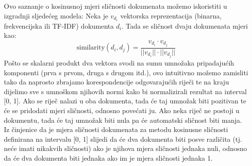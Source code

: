 \documentclass[times, utf8, zavrsni]{fer}
\begin{document}
Ovo saznanje o kosinusnoj mjeri sličnosti dokumenata možemo iskoristiti u izgradnji sljedećeg modela: Neka je $v_{d_i}$ vektorska reprezentacija (binarna, frekvencijska ili TF-IDF) dokumenta $d_{i}$. Tada se sličnost dvaju dokumenata mjeri kao:
\begin{equation}
{\displaystyle {\text{similarity}}(d_{i}, d_{j})}={\frac{v_{d_i} \cdot v_{d_j}}{||v_{d_i}|| \cdot ||v_{d_j}||}}
\end{equation}
Pošto se skalarni produkt dva vektora svodi na sumu umnožaka pripadajućih komponenti (prva s prvom, druga s drugom itd.), ovo intuitivno možemo zamisliti tako da naprosto zbrajamo korespondencije odgovarajućih riječi te na kraju dijelimo sve s umnoškom njihovih normi kako bi normalizirali rezultat na interval [0, 1]. Ako se riječ nalazi u oba dokumenta, tada će taj umnožak biti pozitivan te će se pridodati mjeri sličnosti, odnosno povećati ju. Ako neka riječ ne postoji u dokumentu, tada će taj umnožak biti nula pa će automatski sličnost biti manja. Iz činjenice da je mjera sličnosti dokumenata za metodu kosinusne sličnosti definirana na intervalu [0, 1] slijedi da će dva dokumenta biti posve različita (tj. neće imati nikakvih sličnosti) ako je njihova mjera sličnosti jednaka nuli, odnosno da će dva dokumenta biti jednaka ako im je mjera sličnosti jednaka 1.
\end{document}

